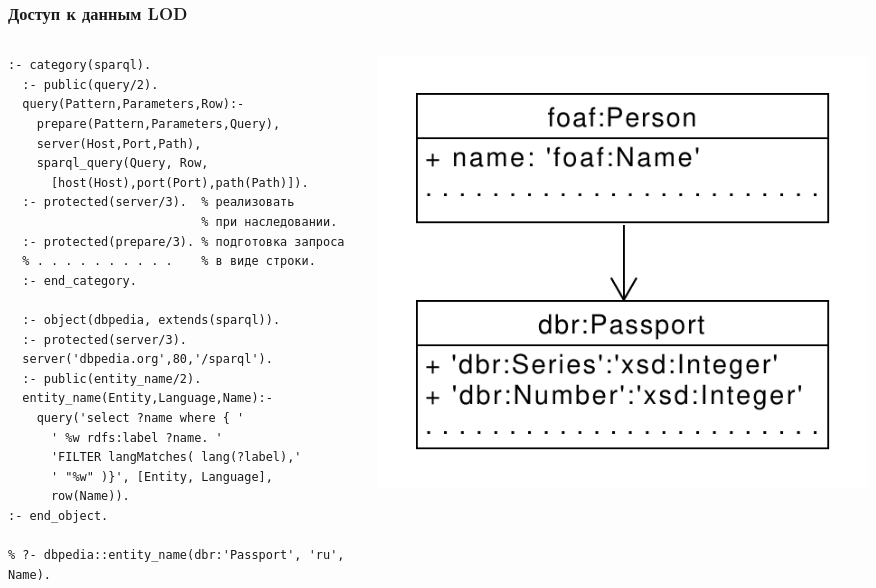 \documentclass[10pt]{beamer}
\begin{document}
\begin{frame}[fragile]
  \frametitle{Доступ к данным LOD}

  \begin{columns}
\begin{column}{0.5\textwidth}
\begin{verbatim}
:- category(sparql).
  :- public(query/2).
  query(Pattern,Parameters,Row):-
    prepare(Pattern,Parameters,Query),
    server(Host,Port,Path),
    sparql_query(Query, Row,
      [host(Host),port(Port),path(Path)]).
  :- protected(server/3).  % реализовать
                           % при наследовании.
  :- protected(prepare/3). % подготовка запроса
  % . . . . . . . . . .    % в виде строки.
  :- end_category.

  :- object(dbpedia, extends(sparql)).
  :- protected(server/3).
  server('dbpedia.org',80,'/sparql').
  :- public(entity_name/2).
  entity_name(Entity,Language,Name):-
    query('select ?name where { '
      ' %w rdfs:label ?name. '
      'FILTER langMatches( lang(?label),'
      ' "%w" )}', [Entity, Language],
      row(Name)).
:- end_object.

% ?- dbpedia::entity_name(dbr:'Passport', 'ru', Name).
\end{verbatim}
\end{column}
\begin{column}{0.5\textwidth}
  \flushright
\includegraphics[width=0.8\linewidth]{simple-diag.pdf}
\end{column}
\end{columns}
\end{frame}
\end{document}
